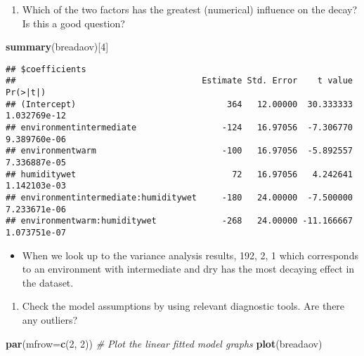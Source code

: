 \documentclass[]{article}
\newenvironment{Shaded}{\begin{snugshade}}{\end{snugshade}}
\newcommand{\CommentTok}[1]{\textcolor[rgb]{0.56,0.35,0.01}{\textit{#1}}}
\newcommand{\DataTypeTok}[1]{\textcolor[rgb]{0.13,0.29,0.53}{#1}}
\newcommand{\DecValTok}[1]{\textcolor[rgb]{0.00,0.00,0.81}{#1}}
\newcommand{\KeywordTok}[1]{\textcolor[rgb]{0.13,0.29,0.53}{\textbf{#1}}}
\newcommand{\NormalTok}[1]{#1}
\providecommand{\tightlist}{%
  \setlength{\itemsep}{0pt}\setlength{\parskip}{0pt}}
\begin{document}
\begin{enumerate}
\def\labelenumi{\alph{enumi})}
\setcounter{enumi}{3}
\tightlist
\item
  Which of the two factors has the greatest (numerical) influence on the
  decay? Is this a good question?
\end{enumerate}

\begin{Shaded}
\begin{Highlighting}[]
\KeywordTok{summary}\NormalTok{(breadaov)[}\DecValTok{4}\NormalTok{]}
\end{Highlighting}
\end{Shaded}

\begin{verbatim}
## $coefficients
##                                     Estimate Std. Error    t value     Pr(>|t|)
## (Intercept)                              364   12.00000  30.333333 1.032769e-12
## environmentintermediate                 -124   16.97056  -7.306770 9.389760e-06
## environmentwarm                         -100   16.97056  -5.892557 7.336887e-05
## humiditywet                               72   16.97056   4.242641 1.142103e-03
## environmentintermediate:humiditywet     -180   24.00000  -7.500000 7.233671e-06
## environmentwarm:humiditywet             -268   24.00000 -11.166667 1.073751e-07
\end{verbatim}

\begin{itemize}
\tightlist
\item
  When we look up to the variance analysis results, 192, 2, 1 which
  corresponds to an environment with intermediate and dry has the most
  decaying effect in the dataset.
\end{itemize}

\begin{enumerate}
\def\labelenumi{\alph{enumi})}
\setcounter{enumi}{4}
\tightlist
\item
  Check the model assumptions by using relevant diagnostic tools. Are
  there any outliers?
\end{enumerate}

\begin{Shaded}
\begin{Highlighting}[]
\KeywordTok{par}\NormalTok{(}\DataTypeTok{mfrow=}\KeywordTok{c}\NormalTok{(}\DecValTok{2}\NormalTok{, }\DecValTok{2}\NormalTok{))}
\CommentTok{# Plot the linear fitted model graphs}
\KeywordTok{plot}\NormalTok{(breadaov)}
\end{Highlighting}
\end{Shaded}
\end{document}
